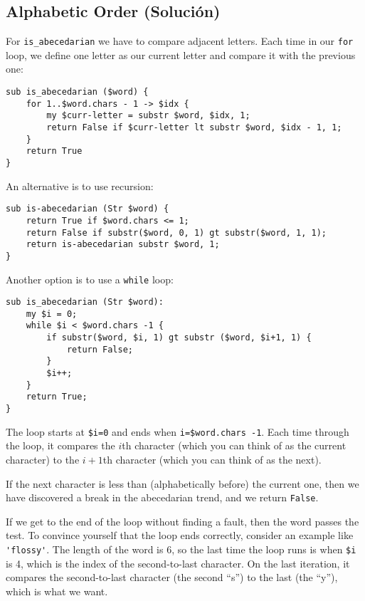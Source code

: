 \subsection{Alphabetic Order (Solución)}

For \verb"is_abecedarian" we have to compare adjacent letters. 
Each time in our {\tt for} loop, we define one letter as our 
current letter and compare it with the previous one:

\begin{verbatim}
sub is_abecedarian ($word) {
    for 1..$word.chars - 1 -> $idx {    
        my $curr-letter = substr $word, $idx, 1;
        return False if $curr-letter lt substr $word, $idx - 1, 1;  
    }     
    return True
}
\end{verbatim}

An alternative is to use recursion:

\begin{verbatim}
sub is-abecedarian (Str $word) {
    return True if $word.chars <= 1;
    return False if substr($word, 0, 1) gt substr($word, 1, 1);
    return is-abecedarian substr $word, 1;
}
\end{verbatim}

Another option is to use a {\tt while} loop:

\begin{verbatim}
sub is_abecedarian (Str $word):
    my $i = 0;
    while $i < $word.chars -1 {
        if substr($word, $i, 1) gt substr ($word, $i+1, 1) {
            return False;
        }
        $i++;
    }
    return True;
}
\end{verbatim}
%
The loop starts at {\tt \$i=0} and ends when {\tt i=\$word.chars -1}.  Each
time through the loop, it compares the $i$th character (which you can
think of as the current character) to the $i+1$th character (which you
can think of as the next).

If the next character is less than (alphabetically before) the current
one, then we have discovered a break in the abecedarian trend, and
we return {\tt False}.

If we get to the end of the loop without finding a fault, then the
word passes the test.  To convince yourself that the loop ends
correctly, consider an example like \verb"'flossy'".  The
length of the word is 6, so
the last time the loop runs is when \verb|$i| is 4, which is the
index of the second-to-last character.  On the last iteration,
it compares the second-to-last character (the second ``s'') to 
the last (the ``y''), which is what we want.

